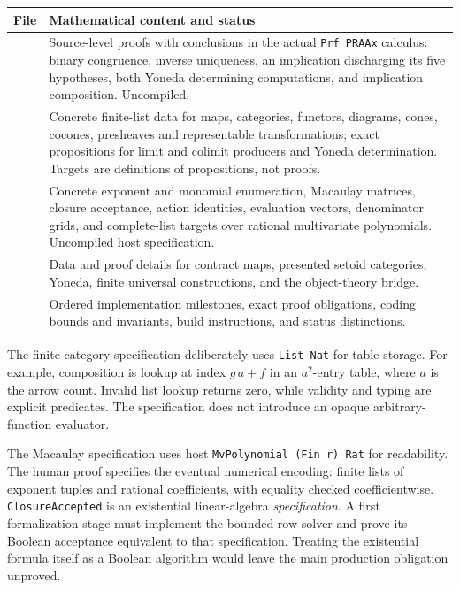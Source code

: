 \begin{longtable}{@{}P{.32\linewidth}P{.61\linewidth}@{}}
\toprule
File & Mathematical content and status\\
\midrule\endhead
{} & Source-level proofs with conclusions in
the actual \texttt{Prf PRAAx} calculus: binary congruence, inverse uniqueness,
an implication discharging its five hypotheses, both Yoneda determining
computations, and implication composition. Uncompiled.\\
 & Concrete finite-list data for maps,
categories, functors, diagrams, cones, cocones, presheaves and representable
transformations; exact propositions for limit and colimit producers and
Yoneda determination. Targets are definitions of propositions, not proofs.\\
 & Concrete exponent and monomial enumeration,
Macaulay matrices, closure acceptance, action identities, evaluation vectors,
denominator grids, and complete-list targets over rational multivariate
polynomials. Uncompiled host specification.\\
 & Data and proof details for contract maps,
presented setoid categories, Yoneda, finite universal constructions, and the
object-theory bridge.\\
 & Ordered implementation milestones, exact
proof obligations, coding bounds and invariants, build instructions, and
status distinctions.\\
\bottomrule
\end{longtable}

The finite-category specification deliberately uses \texttt{List Nat} for
table storage. For example, composition is lookup at index $g\,a+f$ in an
$a^2$-entry table, where $a$ is the arrow count. Invalid list lookup returns
zero, while validity and typing are explicit predicates. The specification
does not introduce an opaque arbitrary-function evaluator.

The Macaulay specification uses host \texttt{MvPolynomial (Fin r) Rat}
for readability. The human proof specifies the eventual numerical encoding:
finite lists of exponent tuples and rational coefficients, with equality
checked coefficientwise. \texttt{ClosureAccepted} is an existential
linear-algebra \emph{specification}. A first formalization stage must implement
the bounded row solver and prove its Boolean acceptance equivalent to that
specification. Treating the existential formula itself as a Boolean algorithm
would leave the main production obligation unproved.

